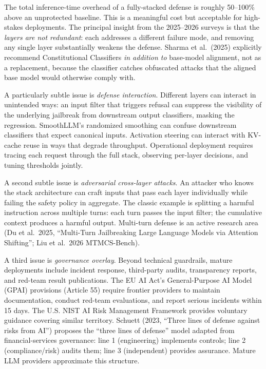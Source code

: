 The total inference-time overhead of a fully-stacked defense is roughly 50--100\% above an unprotected baseline. This is a meaningful cost but acceptable for high-stakes deployments. The principal insight from the 2025--2026 surveys is that the \emph{layers are not redundant}: each addresses a different failure mode, and removing any single layer substantially weakens the defense. Sharma et al.~(2025) explicitly recommend Constitutional Classifiers \emph{in addition to} base-model alignment, not as a replacement, because the classifier catches obfuscated attacks that the aligned base model would otherwise comply with.

A particularly subtle issue is \emph{defense interaction}. Different layers can interact in unintended ways: an input filter that triggers refusal can suppress the visibility of the underlying jailbreak from downstream output classifiers, masking the regression. SmoothLLM's randomized smoothing can confuse downstream classifiers that expect canonical inputs. Activation steering can interact with KV-cache reuse in ways that degrade throughput. Operational deployment requires tracing each request through the full stack, observing per-layer decisions, and tuning thresholds jointly.

A second subtle issue is \emph{adversarial cross-layer attacks}. An attacker who knows the stack architecture can craft inputs that pass each layer individually while failing the safety policy in aggregate. The classic example is splitting a harmful instruction across multiple turns: each turn passes the input filter; the cumulative context produces a harmful output. Multi-turn defense is an active research area (Du et al.~2025, ``Multi-Turn Jailbreaking Large Language Models via Attention Shifting''; Liu et al.~2026 MTMCS-Bench).

A third issue is \emph{governance overlay}. Beyond technical guardrails, mature deployments include incident response, third-party audits, transparency reports, and red-team result publications. The EU AI Act's General-Purpose AI Model (GPAI) provisions (Article 55) require frontier providers to maintain documentation, conduct red-team evaluations, and report serious incidents within 15 days. The U.S. NIST AI Risk Management Framework provides voluntary guidance covering similar territory. Schuett (2023, ``Three lines of defense against risks from AI'') proposes the ``three lines of defense'' model adapted from financial-services governance: line 1 (engineering) implements controls; line 2 (compliance/risk) audits them; line 3 (independent) provides assurance. Mature LLM providers approximate this structure.

